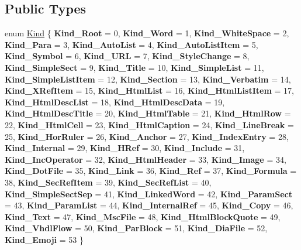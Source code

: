 \subsection*{Public Types}
\begin{DoxyCompactItemize}
\item 
enum \mbox{\hyperlink{class_doc_node_aebd16e89ca590d84cbd40543ea5faadb}{Kind}} \{ \newline
{\bfseries Kind\+\_\+\+Root} = 0, 
{\bfseries Kind\+\_\+\+Word} = 1, 
{\bfseries Kind\+\_\+\+White\+Space} = 2, 
{\bfseries Kind\+\_\+\+Para} = 3, 
\newline
{\bfseries Kind\+\_\+\+Auto\+List} = 4, 
{\bfseries Kind\+\_\+\+Auto\+List\+Item} = 5, 
{\bfseries Kind\+\_\+\+Symbol} = 6, 
{\bfseries Kind\+\_\+\+U\+RL} = 7, 
\newline
{\bfseries Kind\+\_\+\+Style\+Change} = 8, 
{\bfseries Kind\+\_\+\+Simple\+Sect} = 9, 
{\bfseries Kind\+\_\+\+Title} = 10, 
{\bfseries Kind\+\_\+\+Simple\+List} = 11, 
\newline
{\bfseries Kind\+\_\+\+Simple\+List\+Item} = 12, 
{\bfseries Kind\+\_\+\+Section} = 13, 
{\bfseries Kind\+\_\+\+Verbatim} = 14, 
{\bfseries Kind\+\_\+\+X\+Ref\+Item} = 15, 
\newline
{\bfseries Kind\+\_\+\+Html\+List} = 16, 
{\bfseries Kind\+\_\+\+Html\+List\+Item} = 17, 
{\bfseries Kind\+\_\+\+Html\+Desc\+List} = 18, 
{\bfseries Kind\+\_\+\+Html\+Desc\+Data} = 19, 
\newline
{\bfseries Kind\+\_\+\+Html\+Desc\+Title} = 20, 
{\bfseries Kind\+\_\+\+Html\+Table} = 21, 
{\bfseries Kind\+\_\+\+Html\+Row} = 22, 
{\bfseries Kind\+\_\+\+Html\+Cell} = 23, 
\newline
{\bfseries Kind\+\_\+\+Html\+Caption} = 24, 
{\bfseries Kind\+\_\+\+Line\+Break} = 25, 
{\bfseries Kind\+\_\+\+Hor\+Ruler} = 26, 
{\bfseries Kind\+\_\+\+Anchor} = 27, 
\newline
{\bfseries Kind\+\_\+\+Index\+Entry} = 28, 
{\bfseries Kind\+\_\+\+Internal} = 29, 
{\bfseries Kind\+\_\+\+H\+Ref} = 30, 
{\bfseries Kind\+\_\+\+Include} = 31, 
\newline
{\bfseries Kind\+\_\+\+Inc\+Operator} = 32, 
{\bfseries Kind\+\_\+\+Html\+Header} = 33, 
{\bfseries Kind\+\_\+\+Image} = 34, 
{\bfseries Kind\+\_\+\+Dot\+File} = 35, 
\newline
{\bfseries Kind\+\_\+\+Link} = 36, 
{\bfseries Kind\+\_\+\+Ref} = 37, 
{\bfseries Kind\+\_\+\+Formula} = 38, 
{\bfseries Kind\+\_\+\+Sec\+Ref\+Item} = 39, 
\newline
{\bfseries Kind\+\_\+\+Sec\+Ref\+List} = 40, 
{\bfseries Kind\+\_\+\+Simple\+Sect\+Sep} = 41, 
{\bfseries Kind\+\_\+\+Linked\+Word} = 42, 
{\bfseries Kind\+\_\+\+Param\+Sect} = 43, 
\newline
{\bfseries Kind\+\_\+\+Param\+List} = 44, 
{\bfseries Kind\+\_\+\+Internal\+Ref} = 45, 
{\bfseries Kind\+\_\+\+Copy} = 46, 
{\bfseries Kind\+\_\+\+Text} = 47, 
\newline
{\bfseries Kind\+\_\+\+Msc\+File} = 48, 
{\bfseries Kind\+\_\+\+Html\+Block\+Quote} = 49, 
{\bfseries Kind\+\_\+\+Vhdl\+Flow} = 50, 
{\bfseries Kind\+\_\+\+Par\+Block} = 51, 
\newline
{\bfseries Kind\+\_\+\+Dia\+File} = 52, 
{\bfseries Kind\+\_\+\+Emoji} = 53
 \}
\end{DoxyCompactItemize}
